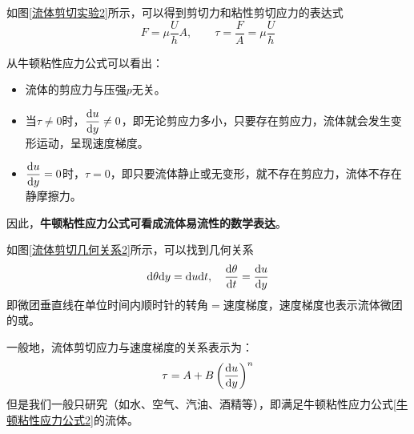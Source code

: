 如图\ref{流体剪切实验2}所示，可以得到剪切力和粘性剪切应力的表达式
\begin{equation}
	F = \mu \dfrac{U}{h}A, \qquad \tau = \dfrac{F}{A} = \mu \dfrac{U}{h}
\end{equation}

\noindent 从牛顿粘性应力公式可以看出：\vspace*{-0.5em}
\begin{itemize}
	\item 流体的剪应力与压强$p$无关。\vspace*{-0.5em}
	\item 当$\tau \neq 0$时，$\dfrac{{\rm{d}} u}{{\rm{d}} y} \neq 0$，即无论剪应力多小，只要存在剪应力，流体就会发生变形运动，呈现速度梯度。\vspace*{-0.5em}
	\item $\dfrac{{\rm{d}} u}{{\rm{d}} y}=0$时，$\tau = 0$，即只要流体静止或无变形，就不存在剪应力，流体不存在静摩擦力。
\end{itemize}
因此，\textbf{牛顿粘性应力公式可看成流体易流性的数学表达}。

如图\ref{流体剪切几何关系2}所示，可以找到几何关系
\begin{equation}
	{\rm{d}} \theta {\rm{d}} y = {\rm{d}} u {\rm{d}} t , \quad \dfrac{{\rm{d}} \theta }{{\rm{d}} t} = \dfrac{{\rm{d}} u}{{\rm{d}} y}
\end{equation}
即微团垂直线在单位时间内顺时针的转角$=$速度梯度，速度梯度也表示流体微团的或。

一般地，流体剪切应力与速度梯度的关系表示为：
\begin{equation}
	\tau = A + B \left(\dfrac{{\rm{d}} u}{{\rm{d}} y}\right)^n
\end{equation}
但是我们一般只研究（如水、空气、汽油、酒精等），即满足牛顿粘性应力公式\eqref{牛顿粘性应力公式2}的流体。


